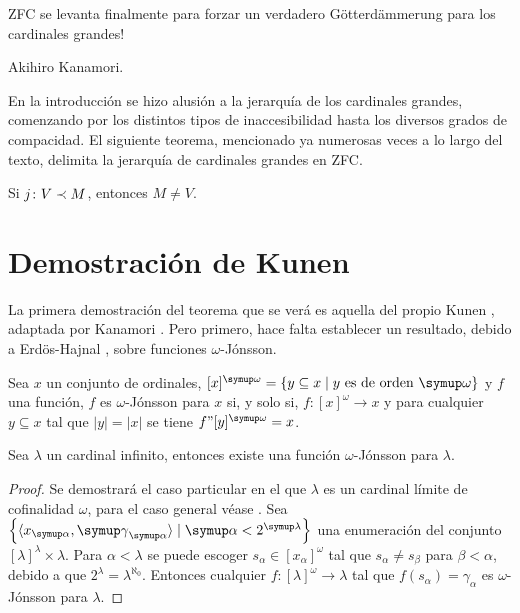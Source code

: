 \epigraph
{
    ZFC se levanta finalmente para forzar
    un verdadero Götterdämmerung para los cardinales
    grandes!
}
{Akihiro Kanamori. \autocite[324]{kanamori_higher_2009}}


En la introducción se hizo alusión a la jerarquía de los cardinales grandes,
comenzando por los distintos tipos de inaccesibilidad hasta los diversos
grados de compacidad. El siguiente teorema, mencionado ya numerosas veces a lo largo
del texto, delimita la jerarquía de cardinales grandes en ZFC.

\begin{teo}\label{teo:kunen}
    Si $j\colon V\prec M$, entonces $M\neq V$.
\end{teo}

\section{Demostración de Kunen}

La primera demostración del teorema que se verá es aquella
del propio Kunen \autocite{kunen_elementary_1971}, adaptada
por Kanamori \autocite{kanamori_higher_2009}. Pero primero,
hace falta establecer un resultado, debido a Erdös-Hajnal \autocite{erdos_problem_1966},
sobre funciones $\omega$-Jónsson.

\begin{defi}
    Sea $x$ un conjunto de ordinales, $[x]^\omega = \set{y\subseteq x\mid \text{$y$ es de orden $\omega$}}$
    y $f$ una función,
    $f$ es $\omega$-Jónsson para $x$ si, y solo si,
    $f\colon [x]^\omega\to x$ y para cualquier $y\subseteq x$
    tal que $|y|=|x|$ se tiene $f"[y]^\omega = x$.
\end{defi}

\begin{teo}\label{teo:jonsson}
    Sea $\lambda$ un cardinal infinito, entonces existe una función $\omega$-Jónsson para $\lambda$.
\end{teo}

\begin{proof}
    Se demostrará el caso particular en el que $\lambda$ es un cardinal límite de cofinalidad $\omega$,
    para el caso general véase \autocite[Teorema 23.13]{kanamori_higher_2009}.
    Sea $\set{\op{x_\alpha,\gamma_\alpha}\mid \alpha < 2^\lambda}$ una enumeración del conjunto $[\lambda]^\lambda\times\lambda$.
    Para $\alpha<\lambda$ se puede escoger $s_\alpha\in[x_\alpha]^\omega$ tal que $s_\alpha\neq s_\beta$ para $\beta<\alpha$,
    debido a que $2^\lambda=\lambda^{\aleph_0}$. Entonces cualquier $f\colon[\lambda]^\omega\to\lambda$
    tal que $f(s_\alpha)=\gamma_\alpha$ es $\omega$-Jónsson para $\lambda$.
\end{proof}

